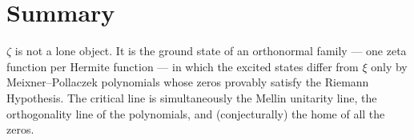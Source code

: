 \documentclass[11pt]{article}
\begin{document}
\section{Summary}

$\zeta$ is not a lone object. It is the ground state of an orthonormal family --- one zeta function per Hermite function --- in which the excited states differ from $\xi$ only by Meixner--Pollaczek polynomials whose zeros provably satisfy the Riemann Hypothesis. The critical line is simultaneously the Mellin unitarity line, the orthogonality line of the polynomials, and (conjecturally) the home of all the zeros.
\end{document}
